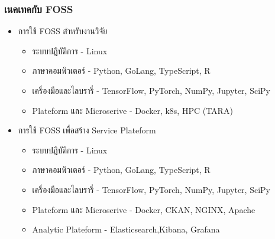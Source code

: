 \begin{frame} [t]
  \frametitle{เนคเทคกับ FOSS}

  \begin{itemize}
    \item การใช้ FOSS สำหรับงานวิจัย
          \begin{itemize}
            \item  ระบบปฎิบัติการ - Linux
            \item ภาษาคอมพิวเตอร์ - Python, GoLang, TypeScript, R
            \item เครื่องมือและไลบรารี่ - TensorFlow, PyTorch, NumPy, Jupyter, SciPy
            \item Plateform และ Microserive - Docker, k8s, HPC (TARA)
          \end{itemize}
    \item การใช้ FOSS เพื่อสร้าง Service Plateform
          \begin{itemize}
            \item  ระบบปฎิบัติการ - Linux
            \item ภาษาคอมพิวเตอร์ - Python, GoLang, TypeScript, R
            \item เครื่องมือและไลบรารี่ - TensorFlow, PyTorch, NumPy, Jupyter, SciPy
            \item Plateform และ Microserive - Docker, CKAN, NGINX, Apache
            \item Analytic Plateform - Elasticsearch,Kibana, Grafana
          \end{itemize}
  \end{itemize}

\end{frame}